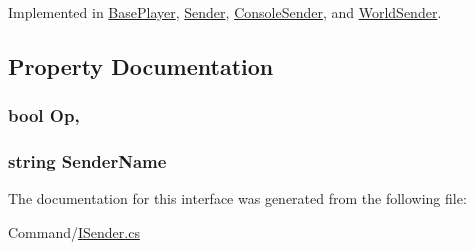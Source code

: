 Implemented in \hyperlink{classOTA_1_1BasePlayer_aab351e86d2672170773b0e58782ce64c}{Base\+Player}, \hyperlink{classOTA_1_1Command_1_1Sender_a88442a754fb4b417ea6f7fcb0058b75e}{Sender}, \hyperlink{classOTA_1_1Command_1_1ConsoleSender_a39f7a740cc58640c8502e2159e5c724d}{Console\+Sender}, and \hyperlink{classOTA_1_1Command_1_1WorldSender_a061eb30c76097e9fec57819bbe379599}{World\+Sender}.



\subsection{Property Documentation}
\hypertarget{interfaceOTA_1_1Command_1_1ISender_a21ba9f1622dc7475d067844accea3cf6}{}
\subsubsection[{Op}]{\setlength{\rightskip}{0pt plus 5cm}bool Op\hspace{0.3cm}{\ttfamily [get]}, {\ttfamily [set]}}\label{interfaceOTA_1_1Command_1_1ISender_a21ba9f1622dc7475d067844accea3cf6}
\hypertarget{interfaceOTA_1_1Command_1_1ISender_a8435cbd7a4dda595164d4ff47d4f4525}{}
\subsubsection[{Sender\+Name}]{\setlength{\rightskip}{0pt plus 5cm}string Sender\+Name\hspace{0.3cm}{\ttfamily [get]}}\label{interfaceOTA_1_1Command_1_1ISender_a8435cbd7a4dda595164d4ff47d4f4525}


The documentation for this interface was generated from the following file\+:\begin{DoxyCompactItemize}
\item 
Command/\hyperlink{ISender_8cs}{I\+Sender.\+cs}\end{DoxyCompactItemize}
